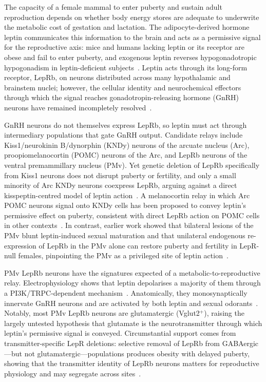 \documentclass[11pt]{article}
\begin{document}
The capacity of a female mammal to enter puberty and sustain adult reproduction depends on whether body energy stores are adequate to underwrite the metabolic cost of gestation and lactation. The adipocyte-derived hormone leptin communicates this information to the brain and acts as a permissive signal for the reproductive axis: mice and humans lacking leptin or its receptor are obese and fail to enter puberty, and exogenous leptin reverses hypogonadotropic hypogonadism in leptin-deficient subjects~\citep{ahima1997leptin,farooqi2014twenty}. Leptin acts through its long-form receptor, LepRb, on neurons distributed across many hypothalamic and brainstem nuclei; however, the cellular identity and neurochemical effectors through which the signal reaches gonadotropin-releasing hormone (GnRH) neurons have remained incompletely resolved~\citep{louis2011molecular}.

GnRH neurons do not themselves express LepRb, so leptin must act through intermediary populations that gate GnRH output. Candidate relays include Kiss1/neurokinin B/dynorphin (KNDy) neurons of the arcuate nucleus (Arc), proopiomelanocortin (POMC) neurons of the Arc, and LepRb neurons of the ventral premammillary nucleus (PMv). Yet genetic deletion of LepRb specifically from Kiss1 neurons does not disrupt puberty or fertility, and only a small minority of Arc KNDy neurons coexpress LepRb, arguing against a direct kisspeptin-centred model of leptin action~\citep{donato2011leptin,cravo2011kiss1,louis2011molecular,true2011leptin}. A melanocortin relay in which Arc POMC neurons signal onto KNDy cells has been proposed to convey leptin's permissive effect on puberty, consistent with direct LepRb action on POMC cells in other contexts~\citep{manfredilozano2016defining,berglund2012direct}. In contrast, earlier work showed that bilateral lesions of the PMv blunt leptin-induced sexual maturation and that unilateral endogenous re-expression of LepRb in the PMv alone can restore puberty and fertility in LepR-null females, pinpointing the PMv as a privileged site of leptin action~\citep{donato2011leptin,mahany2018obesity}.

PMv LepRb neurons have the signatures expected of a metabolic-to-reproductive relay. Electrophysiology shows that leptin depolarises a majority of them through a PI3K/TRPC-dependent mechanism~\citep{williams2011acute}. Anatomically, they monosynaptically innervate GnRH neurons and are activated by both leptin and sexual odorants~\citep{leshan2009direct}. Notably, most PMv LepRb neurons are glutamatergic (Vglut2$^{+}$), raising the largely untested hypothesis that glutamate is the neurotransmitter through which leptin's permissive signal is conveyed. Circumstantial support comes from transmitter-specific LepR deletions: selective removal of LepRb from GABAergic---but not glutamatergic---populations produces obesity with delayed puberty, showing that the transmitter identity of LepRb neurons matters for reproductive physiology and may segregate across sites~\citep{martin2014leptinresponsive}.
\end{document}
